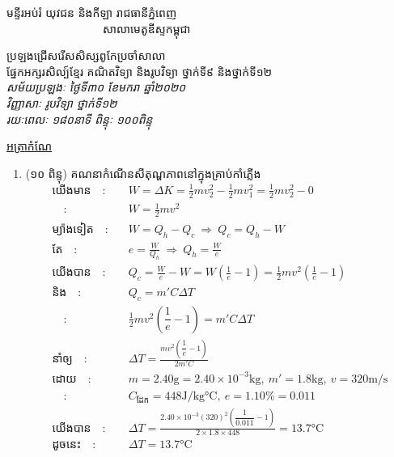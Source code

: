 \documentclass{classes/exam}
\begin{document}
		\begin{flushleft}
			{\kml មន្ទីរអប់រំ យុវជន និងកីឡា រាជធានីភ្នំពេញ\\
				~~~~~~~~~~~~~~~~~សាលាមេតូឌីស្ទកម្ពុជា}
		\end{flushleft}
		\begin{center}
			{\kml ប្រឡងជ្រើសរើសសិស្សពូកែប្រចាំសាលា}\\
			{\kml ផ្នែកអក្សរសិល្ប៍ខ្មែរ គណិតវិទ្យា និងរូបវិទ្យា ថ្នាក់ទី៩ និងថ្នាក់ទី១២}\\
			{\emph{\kob សម័យប្រឡងៈ ថ្ងៃទី៣០ ខែមករា ឆ្នាំ២០២០\\
					វិញ្ញាសាៈ {\kml រូបវិទ្យា ថ្នាក់ទី១២}\\
					រយៈពេលៈ ១៨០នាទី \quad ពិន្ទុៈ ១០០ពិន្ទុ}}
		\end{center}
	{\kml \underline{អត្រាកំណែ}}
	\begin{enumerate}[I]
		\item {\color{magenta}\ks (១០ ពិន្ទុ)} គណនាកំណើនសីតុណ្ហភាពនៅក្នុងគ្រាប់កាំភ្លើង
		\begin{align*}
			\text{យើងមាន}\quad :&\quad W=\Delta K=\frac{1}{2}mv^{2}_{2}-\frac{1}{2}mv^{2}_{1}=\frac{1}{2}mv^{2}_{2}-0\\
			\quad :&\quad W=\frac{1}{2}mv^{2}\\
			\text{ម្យ៉ាងទៀត}\quad:&\quad W=Q_{h}-Q_{c}~\Rightarrow~Q_{c}=Q_{h}-W\\
			\text{តែ}\quad:&\quad e=\frac{W}{Q_{h}}~\Rightarrow~Q_{h}=\frac{W}{e}\\
			\text{យើងបាន}\quad :&\quad Q_{c}=\frac{W}{e}-W=W\left(\frac{1}{e}-1\right)=\frac{1}{2}mv^{2}\left(\frac{1}{e}-1\right)\\
			\text{និង}\quad :&\quad Q_{c}=m'C\Delta T\\
			\quad :&\quad \frac{1}{2}mv^{2}\left(\dfrac{1}{e}-1\right)=m'C\Delta T\\
			\text{នាំឲ្យ}\quad :&\quad \Delta T=\frac{mv^{2}\left(\dfrac{1}{e}-1\right)}{2m'C}\\
			\text{ដោយ}\quad :&\quad m=2.40\si{\gram}=2.40\times 10^{-3}\si{\kilogram},~m'=1.8\si{\kilogram},~v=320\si{\metre/\second}\\
			\quad :&\quad C_{\text{ដែក}}=448\si{\joule/\kilogram\celsius},~e=1.10\%=0.011\\
			\text{យើងបាន}\quad :&\quad \Delta T=\frac{2.40\times 10^{-3}\left(320\right)^{2}\left(\dfrac{1}{0.011}-1\right)}{2\times 1.8 \times 448}=13.7\si{\celsius}\\
			\text{ដូចនេះ}\quad :&\quad \Delta T=13.7\si{\celsius}
		\end{align*}

\end{enumerate}
\end{document}
